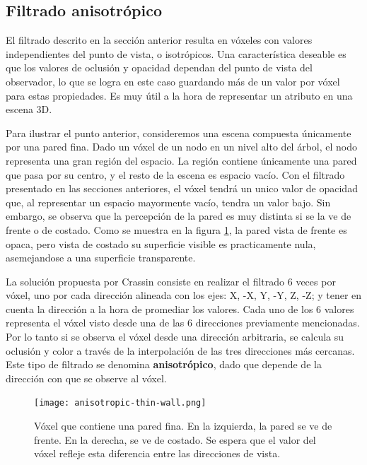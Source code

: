 
\subsection{Filtrado anisotrópico}

El filtrado descrito en la sección anterior resulta en vóxeles con valores independientes del punto de vista, o isotrópicos.
Una característica deseable es que los valores de oclusión y opacidad dependan del punto de vista del observador, lo que se logra en este caso guardando más de un valor por vóxel para estas propiedades.
Es muy útil a la hora de representar un atributo en una escena 3D.

Para ilustrar el punto anterior, consideremos una escena compuesta únicamente por una pared fina.
Dado un vóxel de un nodo en un nivel alto del árbol, el nodo representa una gran región del espacio.
La región contiene únicamente una pared que pasa por su centro, y el resto de la escena es espacio vacío.
Con el filtrado presentado en las secciones anteriores, el vóxel tendrá un unico valor de opacidad que, al representar un espacio mayormente vacío, tendra un valor bajo.
Sin embargo, se observa que la percepción de la pared es muy distinta si se la ve de frente o de costado.
Como se muestra en la figura \ref{fig:anisotropic-thin-wall}, la pared vista de frente es opaca, pero vista de costado su superficie visible es practicamente nula, asemejandose a una superficie transparente.

La solución propuesta por Crassin \cite{voxel-cone-tracing} consiste en realizar el filtrado 6 veces por vóxel, uno por cada dirección alineada con los ejes: X, -X, Y, -Y, Z, -Z; y tener en cuenta la dirección a la hora de promediar los valores.
Cada uno de los 6 valores representa el vóxel visto desde una de las 6 direcciones previamente mencionadas. Por lo tanto si se observa el vóxel desde una dirección arbitraria, se calcula su oclusión y color a través de la interpolación de las tres direcciones más cercanas.
Este tipo de filtrado se denomina \textbf{anisotrópico}, dado que depende de la dirección con que se observe al vóxel.

\begin{figure}
    \centering
    \texttt{[image: anisotropic-thin-wall.png]}
    \caption{
        Vóxel que contiene una pared fina.
        En la izquierda, la pared se ve de frente.
        En la derecha, se ve de costado.
        Se espera que el valor del vóxel refleje esta diferencia entre las direcciones de vista.
    }
    \label{fig:anisotropic-thin-wall}
\end{figure}

